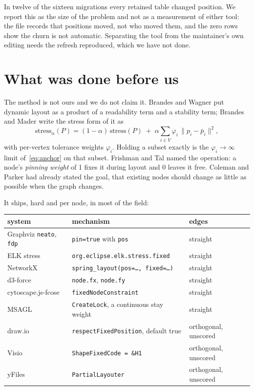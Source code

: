 \documentclass[11pt]{article}
\begin{document}
In twelve of the sixteen migrations every retained table changed position. We report this
as the size of the problem and not as a measurement of either tool: the file records that
positions moved, not who moved them, and the zero rows show the churn is not automatic.
Separating the tool from the maintainer's own editing needs the refresh reproduced, which
we have not done.

\section{What was done before us}

The method is not ours and we do not claim it. Brandes and Wagner \cite{bw97} put dynamic
layout as a product of a readability term and a stability term; Brandes and Mader
\cite{bm11} write the stress form of it as
\begin{equation}
\mathrm{stress}_\alpha(P) = (1-\alpha)\,\mathrm{stress}(P)
  \;+\; \alpha \sum_{i \in V} \varphi_i \, \lVert p_i - \bar p_i \rVert^2 ,
\label{eq:anchor}
\end{equation}
with per-vertex tolerance weights $\varphi_i$. Holding a subset exactly is the
$\varphi_i \to \infty$ limit of~\eqref{eq:anchor} on that subset. Frishman and Tal
\cite{ft08} named the operation: a node's \emph{pinning weight} of 1 fixes it during layout
and 0 leaves it free. Coleman and Parker \cite{cp96} had already stated the goal, that
existing nodes should change as little as possible when the graph changes.

It ships, hard and per node, in most of the field:

\begin{center}\small
\begin{tabular}{@{}lll@{}}
\toprule
system & mechanism & edges \\
\midrule
Graphviz \texttt{neato}, \texttt{fdp} & \texttt{pin=true} with \texttt{pos} & straight \\
ELK stress & \texttt{org.eclipse.elk.stress.fixed} & straight \\
NetworkX & \texttt{spring\_layout(pos=\ldots, fixed=\ldots)} & straight \\
d3-force & \texttt{node.fx}, \texttt{node.fy} & straight \\
cytoscape.js-fcose & \texttt{fixedNodeConstraint} & straight \\
MSAGL & \texttt{CreateLock}, a continuous stay weight & straight \\
draw.io & \texttt{respectFixedPosition}, default true & orthogonal, unscored \\
Visio & \texttt{ShapeFixedCode = \&H1} & orthogonal, unscored \\
yFiles & \texttt{PartialLayouter} & orthogonal, unscored \\
\bottomrule
\end{tabular}
\end{center}
\end{document}
